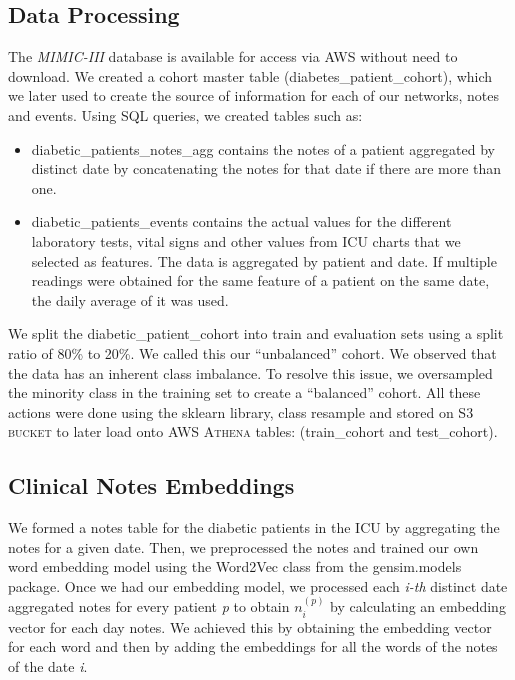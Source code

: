 \documentclass{sigkddExp}
\begin{document}
\subsection {Data Processing}
The \textit{MIMIC-III} database is available for access via \textsc{AWS} without need to download. 
We created a cohort master table (\textsf{diabetes\_patient\_cohort}), which we later used to 
create the source of information for each of our networks, notes and events. Using 
SQL queries, we created tables such as:
\begin{itemize}
       \item \textsf{diabetic\_patients\_notes\_agg} contains the notes of a patient aggregated by distinct 
date by concatenating the notes for that date if there are more than one.
      \item \textsf{diabetic\_patients\_events} contains the actual values for the different laboratory tests, 
vital signs and other values from ICU charts that we selected as features.  The data is 
aggregated by patient and date.  If multiple readings were obtained for the same feature 
of a patient on the same date, the daily average of it was used.
\end{itemize}

We split the \textsf{diabetic\_patient\_cohort} into train and evaluation sets using a split ratio of 
80\% to 20\%.  We called this our ``unbalanced'' cohort. We observed that the data has an inherent 
class imbalance. To resolve this issue, we oversampled the minority class in the training 
set to create a ``balanced'' cohort. All these actions were done using the \textsf{sklearn} library, 
\textsf{class resample} and stored on \textsc{S3 bucket} to later load onto \textsc{AWS Athena} tables: (\textsf{train\_cohort} 
and \textsf{test\_cohort}).

\subsection{Clinical Notes Embeddings}
We formed a notes table for the diabetic patients in the ICU by aggregating the notes for a given date. 
Then, we preprocessed the notes and trained our own word embedding model using the \textsf{Word2Vec} class from 
the \textsf{gensim.models} package. Once we had our embedding model, we processed each \textit{i-th} distinct date aggregated 
notes for every patient \textit{p} to obtain $\mathit n_i^{(p)}$ by calculating an embedding vector for each day 
notes.  We achieved this by obtaining the embedding vector for each word and then by adding the embeddings for all the 
words of the notes of the date \textit{i}. 
\end{document}
